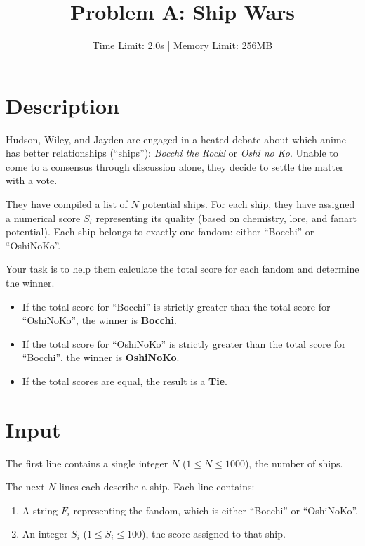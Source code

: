 \documentclass[11pt]{article}
\title{\textbf{Problem A: Ship Wars}}
\author{Time Limit: 2.0s | Memory Limit: 256MB}
\date{}
\begin{document}
\maketitle

\section*{Description}

Hudson, Wiley, and Jayden are engaged in a heated debate about which anime has better relationships (``ships''): \textit{Bocchi the Rock!} or \textit{Oshi no Ko}. Unable to come to a consensus through discussion alone, they decide to settle the matter with a vote.

They have compiled a list of $N$ potential ships. For each ship, they have assigned a numerical score $S_i$ representing its quality (based on chemistry, lore, and fanart potential). Each ship belongs to exactly one fandom: either ``Bocchi'' or ``OshiNoKo''.

Your task is to help them calculate the total score for each fandom and determine the winner.

\begin{itemize}
    \item If the total score for ``Bocchi'' is strictly greater than the total score for ``OshiNoKo'', the winner is \textbf{Bocchi}.
    \item If the total score for ``OshiNoKo'' is strictly greater than the total score for ``Bocchi'', the winner is \textbf{OshiNoKo}.
    \item If the total scores are equal, the result is a \textbf{Tie}.
\end{itemize}

\section*{Input}

The first line contains a single integer $N$ ($1 \le N \le 1000$), the number of ships.

The next $N$ lines each describe a ship. Each line contains:
\begin{enumerate}
    \item A string $F_i$ representing the fandom, which is either ``Bocchi'' or ``OshiNoKo''.
    \item An integer $S_i$ ($1 \le S_i \le 100$), the score assigned to that ship.
\end{enumerate}
\end{document}
